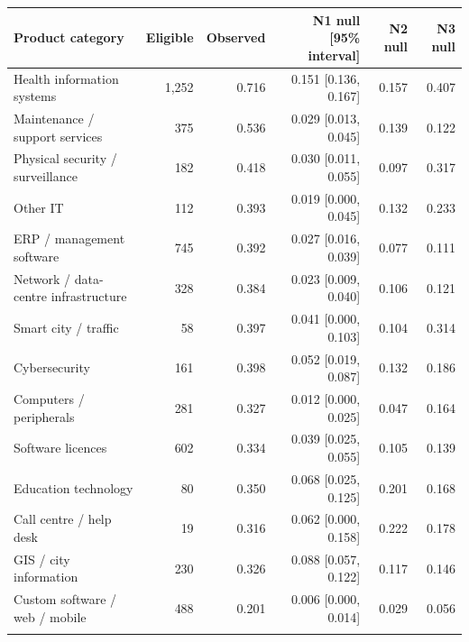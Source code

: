 \begin{tabular}{@{}lrrrrr@{}}
\toprule
Product category & Eligible & Observed & N1 null [95\% interval] & N2 null & N3 null\\
\midrule
Health information systems & 1,252 & 0.716 & 0.151 [0.136, 0.167] & 0.157 & 0.407\\
Maintenance / support services & 375 & 0.536 & 0.029 [0.013, 0.045] & 0.139 & 0.122\\
Physical security / surveillance & 182 & 0.418 & 0.030 [0.011, 0.055] & 0.097 & 0.317\\
Other IT & 112 & 0.393 & 0.019 [0.000, 0.045] & 0.132 & 0.233\\
ERP / management software & 745 & 0.392 & 0.027 [0.016, 0.039] & 0.077 & 0.111\\
Network / data-centre infrastructure & 328 & 0.384 & 0.023 [0.009, 0.040] & 0.106 & 0.121\\
Smart city / traffic & 58 & 0.397 & 0.041 [0.000, 0.103] & 0.104 & 0.314\\
Cybersecurity & 161 & 0.398 & 0.052 [0.019, 0.087] & 0.132 & 0.186\\
Computers / peripherals & 281 & 0.327 & 0.012 [0.000, 0.025] & 0.047 & 0.164\\
Software licences & 602 & 0.334 & 0.039 [0.025, 0.055] & 0.105 & 0.139\\
Education technology & 80 & 0.350 & 0.068 [0.025, 0.125] & 0.201 & 0.168\\
Call centre / help desk & 19 & 0.316 & 0.062 [0.000, 0.158] & 0.222 & 0.178\\
GIS / city information & 230 & 0.326 & 0.088 [0.057, 0.122] & 0.117 & 0.146\\
Custom software / web / mobile & 488 & 0.201 & 0.006 [0.000, 0.014] & 0.029 & 0.056\\
\botrule
\end{tabular}